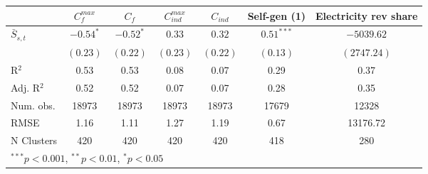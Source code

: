 
\begin{tabular}{l c c c c c c }
\toprule
 & $C^{max}_{f}$ & $C_{f}$ & $C^{max}_{ind}$ & $C_{ind}$ & Self-gen (1) & Electricity rev share \\
\midrule
$\bar{S}_{s,t}$ & $-0.54^{*}$ & $-0.52^{*}$ & $0.33$   & $0.32$   & $0.51^{***}$ & $-5039.62$  \\
                & $(0.23)$    & $(0.22)$    & $(0.23)$ & $(0.22)$ & $(0.13)$     & $(2747.24)$ \\
\midrule
R$^2$           & 0.53        & 0.53        & 0.08     & 0.07     & 0.29         & 0.37        \\
Adj. R$^2$      & 0.52        & 0.52        & 0.07     & 0.07     & 0.28         & 0.35        \\
Num. obs.       & 18973       & 18973       & 18973    & 18973    & 17679        & 12328       \\
RMSE            & 1.16        & 1.11        & 1.27     & 1.19     & 0.67         & 13176.72    \\
N Clusters      & 420         & 420         & 420      & 420      & 418          & 280         \\
\bottomrule
\multicolumn{7}{l}{\tiny{$^{***}p<0.001$, $^{**}p<0.01$, $^*p<0.05$}}
\end{tabular}
